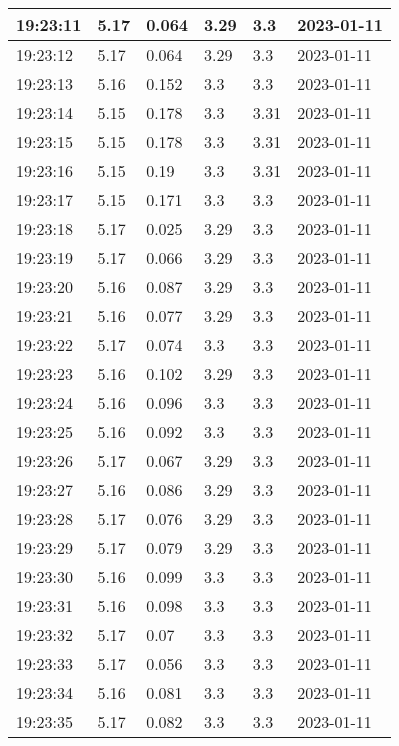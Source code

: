 \begin{longtable}{|l|l|l|l|l|l|}
        19:23:11 & 5.17 & 0.064 & 3.29 & 3.3 & 2023-01-11 \\ \hline
        19:23:12 & 5.17 & 0.064 & 3.29 & 3.3 & 2023-01-11 \\ \hline
        19:23:13 & 5.16 & 0.152 & 3.3 & 3.3 & 2023-01-11 \\ \hline
        19:23:14 & 5.15 & 0.178 & 3.3 & 3.31 & 2023-01-11 \\ \hline
        19:23:15 & 5.15 & 0.178 & 3.3 & 3.31 & 2023-01-11 \\ \hline
        19:23:16 & 5.15 & 0.19 & 3.3 & 3.31 & 2023-01-11 \\ \hline
        19:23:17 & 5.15 & 0.171 & 3.3 & 3.3 & 2023-01-11 \\ \hline
        19:23:18 & 5.17 & 0.025 & 3.29 & 3.3 & 2023-01-11 \\ \hline
        19:23:19 & 5.17 & 0.066 & 3.29 & 3.3 & 2023-01-11 \\ \hline
        19:23:20 & 5.16 & 0.087 & 3.29 & 3.3 & 2023-01-11 \\ \hline
        19:23:21 & 5.16 & 0.077 & 3.29 & 3.3 & 2023-01-11 \\ \hline
        19:23:22 & 5.17 & 0.074 & 3.3 & 3.3 & 2023-01-11 \\ \hline
        19:23:23 & 5.16 & 0.102 & 3.29 & 3.3 & 2023-01-11 \\ \hline
        19:23:24 & 5.16 & 0.096 & 3.3 & 3.3 & 2023-01-11 \\ \hline
        19:23:25 & 5.16 & 0.092 & 3.3 & 3.3 & 2023-01-11 \\ \hline
        19:23:26 & 5.17 & 0.067 & 3.29 & 3.3 & 2023-01-11 \\ \hline
        19:23:27 & 5.16 & 0.086 & 3.29 & 3.3 & 2023-01-11 \\ \hline
        19:23:28 & 5.17 & 0.076 & 3.29 & 3.3 & 2023-01-11 \\ \hline
        19:23:29 & 5.17 & 0.079 & 3.29 & 3.3 & 2023-01-11 \\ \hline
        19:23:30 & 5.16 & 0.099 & 3.3 & 3.3 & 2023-01-11 \\ \hline
        19:23:31 & 5.16 & 0.098 & 3.3 & 3.3 & 2023-01-11 \\ \hline
        19:23:32 & 5.17 & 0.07 & 3.3 & 3.3 & 2023-01-11 \\ \hline
        19:23:33 & 5.17 & 0.056 & 3.3 & 3.3 & 2023-01-11 \\ \hline
        19:23:34 & 5.16 & 0.081 & 3.3 & 3.3 & 2023-01-11 \\ \hline
        19:23:35 & 5.17 & 0.082 & 3.3 & 3.3 & 2023-01-11 \\ \hline

\end{longtable}
